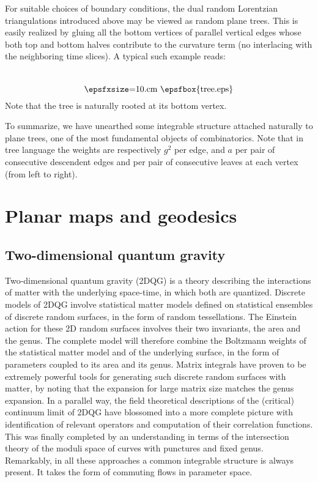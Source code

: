 \documentclass[12pt]{amsart}
\numberwithin{equation}{section}
\begin{document}
For suitable choices of boundary conditions, the dual random Lorentzian triangulations introduced above may
be viewed as random plane trees. This is easily realized by gluing all the bottom vertices of parallel vertical edges
whose both top and bottom halves contribute to the curvature term (no interlacing with the neighboring time slices).
A typical such example reads:
$$ \raisebox{-1.cm}{\hbox{\epsfxsize=10.cm \epsfbox{tree.eps}}}$$
Note that the tree is naturally rooted at its bottom vertex.

To summarize, we have unearthed some integrable structure attached naturally to plane trees, one of the most fundamental
objects of combinatorics. Note that in tree language the weights are respectively $g^2$ per edge, and $a$ 
per pair of consecutive descendent edges and per pair of consecutive leaves at each vertex (from left to right).

\section{Planar maps and geodesics}

\subsection{Two-dimensional quantum gravity}

Two-dimensional quantum gravity (2DQG) is a theory describing the interactions of matter with the underlying
space-time, in which both are quantized. Discrete models of 2DQG involve statistical matter models defined
on statistical ensembles of discrete random surfaces, in the form of random tessellations. The Einstein action
for these 2D random surfaces involves their two invariants, the area and the genus. The complete model will therefore
combine the Boltzmann weights of the statistical matter model and of the underlying surface, in the form of 
parameters coupled to its area and its genus. Matrix integrals have proven to be extremely powerful tools for
generating such discrete random surfaces with matter, by noting that the expansion for large matrix size 
matches the genus expansion. In a parallel way,
the field theoretical descriptions of the (critical) continuum limit of 2DQG have blossomed into a
more complete picture with identification of relevant operators and computation of their correlation functions.
This was finally completed by an understanding in terms of the intersection theory of the moduli space of curves with punctures
and fixed genus. Remarkably, in all these approaches a common integrable structure is always present. It takes
the form of commuting flows in parameter space.
\end{document}
